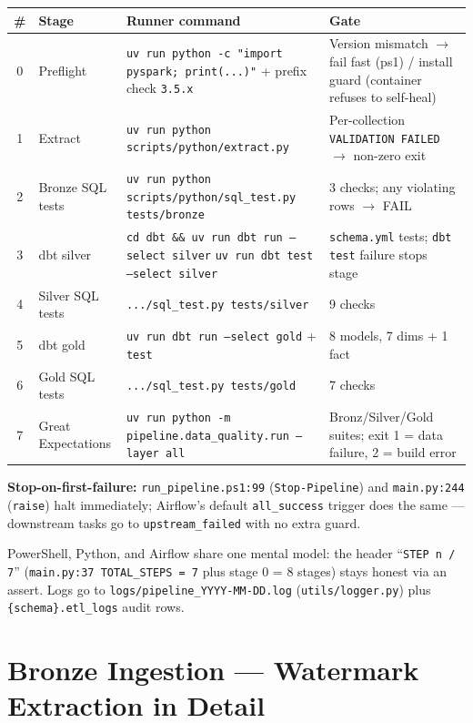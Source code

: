 \documentclass[11pt,a4paper]{article}
\begin{document}
\begin{center}
\begin{longtable}{cl l l}
\toprule
\# & Stage & Runner command & Gate \\
\midrule
\endhead
0 & Preflight & \texttt{uv run python -c "import pyspark; print(...)"} + prefix check \texttt{3.5.x} & Version mismatch $\rightarrow$ fail fast (ps1) / install guard (container refuses to self-heal) \\
1 & Extract & \texttt{uv run python scripts/python/extract.py} & Per-collection \texttt{VALIDATION FAILED} $\rightarrow$ non-zero exit \\
2 & Bronze SQL tests & \texttt{uv run python scripts/python/sql\_test.py tests/bronze} & 3 checks; any violating rows $\rightarrow$ FAIL \\
3 & dbt silver & \texttt{cd dbt \&\& uv run dbt run --select silver} \newline \texttt{uv run dbt test --select silver} & \texttt{schema.yml} tests; \texttt{dbt test} failure stops stage \\
4 & Silver SQL tests & \texttt{.../sql\_test.py tests/silver} & 9 checks \\
5 & dbt gold & \texttt{uv run dbt run --select gold} + \texttt{test} & 8 models, 7 dims + 1 fact \\
6 & Gold SQL tests & \texttt{.../sql\_test.py tests/gold} & 7 checks \\
7 & Great Expectations & \texttt{uv run python -m pipeline.data\_quality.run --layer all} & Bronz/Silver/Gold suites; exit 1 = data failure, 2 = build error \\
\bottomrule
\end{longtable}
\end{center}

\textbf{Stop-on-first-failure:} \texttt{run\_pipeline.ps1:99} (\texttt{Stop-Pipeline}) and \texttt{main.py:244} (\texttt{raise}) halt immediately; Airflow's default \texttt{all\_success} trigger does the same — downstream tasks go to \texttt{upstream\_failed} with no extra guard.

PowerShell, Python, and Airflow share one mental model: the header ``\texttt{STEP n / 7}'' (\texttt{main.py:37 TOTAL\_STEPS = 7} plus stage 0 = 8 stages) stays honest via an assert. Logs go to \texttt{logs/pipeline\_YYYY-MM-DD.log} (\texttt{utils/logger.py}) plus \texttt{\{schema\}.etl\_logs} audit rows.

\section{Bronze Ingestion — Watermark Extraction in Detail}
\end{document}
